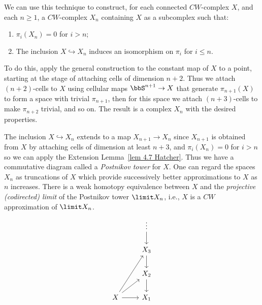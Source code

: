 \begin{example}
    We can use this technique to construct, for each connected $CW$-complex $X$, and each $n\geq 1$, a $CW$-complex $X_n$ containing $X$ as a subcomplex such that:
    \begin{enumerate}[label=(\alph*)]
        \item $\pi_i(X_n)=0$ for $i>n$;
        \item The inclusion $X\hookrightarrow X_n$ induces an isomorphism on $\pi_i$ for $i\leq n$.
    \end{enumerate}
    To do this, apply the general construction to the constant map of $X$ to a point, starting at the stage of attaching cells of dimension $n+2$. Thus we attach $(n+2)$-cells to $X$ using cellular maps $\bbS^{n+1}\to X$ that generate $\pi_{n+1}(X)$ to form a space with trivial $\pi_{n+1}$, then for this space we attach $(n+3)$-cells to make $\pi_{n+2}$ trivial, and so on. The result is a complex $X_n$ with the desired properties.

    The inclusion $X\hookrightarrow X_n$ extends to a map $X_{n+1}\to X_n$ since $X_{n+1}$ is obtained from $X$ by attaching cells of dimension at least $n+3$, and $\pi_i(X_n)=0$ for $i>n$ so we can apply the Extension Lemma~\ref{lem 4.7 Hatcher}. Thus we have a commutative diagram called a \emph{Postnikov tower} for $X$. One can regard the spaces $X_n$ as truncations of $X$ which provide successively better approximations to $X$ as $n$ increases. There is a weak homotopy equivalence between $X$ and the \emph{projective (codirected) limit} of the Postnikov tower $\limit X_n$, i.e., $X$ is a $CW$ approximation of $\limit X_n$.
    \[
    \begin{tikzcd}[every matrix/.append style={name=m}]
       & \vdots \arrow[d]\\
       & X_3 \arrow[d]\\
       & X_2 \arrow[d]\\
       X\arrow[r]\arrow[ur]\arrow[uur] & X_1
    \end{tikzcd}
    \]
\end{example}



